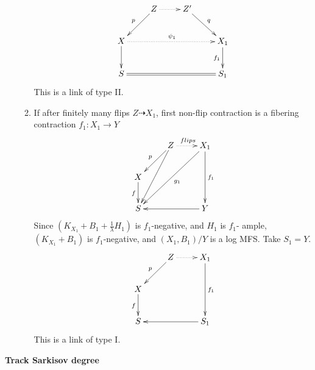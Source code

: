 \documentclass{article}
\begin{document}
\begin{enumerate}[step 1]
\begin{enumerate}[1)]
$$ \xymatrix{
&Z\ar[ld]_p\ar@{.>}[r]&Z'\ar[dr]^{q}&\\
X\ar[d]\ar@{.>}[rrr]^{\psi_1}&&&X_1\ar[d]_{f_1}\\
S\ar@{=}[rrr]&&&S_1} $$
This is a link of type II.
\item If after finitely many flips $ Z\dashrightarrow X_1 $, first non-flip contraction is a fibering contraction $ f_1:X_1\to Y  $ 
$$ \xymatrix{
&Z\ar[ld]_p\ar[ldd]\ar@{.>}[r]^{flips}&X_1\ar[lldd]^{g_1}\ar[dd]^{f_1}\\
X\ar[d]_f&&\\
S &&Y\ar[ll]}$$
Since $ (K_{X_1}+B_1+\frac{1}{\lambda}H_1) $ is $ f_1 $-negative, and $ H_1 $ is $ f_1 $- ample, $ (K_{X_1}+B_1) $ is $ f_1 $-negative, and $ (X_1,B_1)/Y $ is a log MFS.  Take $ S_1=Y $.
$$ \xymatrix{
&Z\ar[ld]_p\ar@{.>}[r]&X_1\ar[dd]^{f_1}\\
X\ar[d]_f&&\\
S &&S_1\ar[ll]}$$
This is a link of type I.
\end{enumerate} 
\end{enumerate}


\textbf{Track Sarkisov degree}
\end{document}

